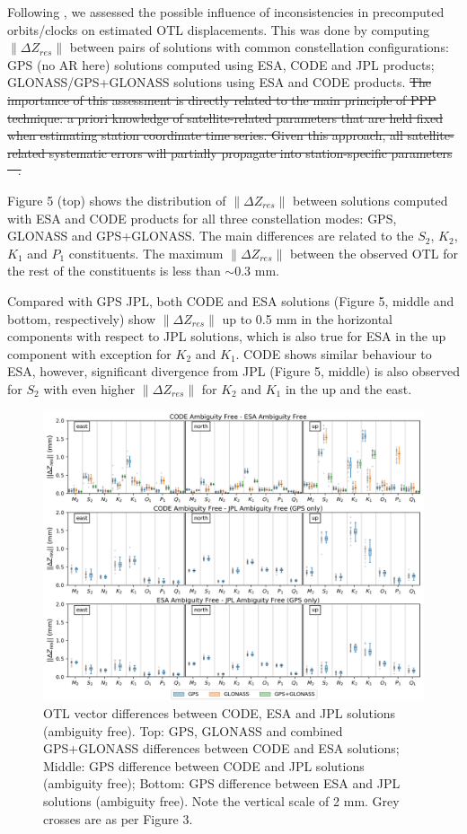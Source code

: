 \documentclass[se, manuscript]{copernicus}
\providecommand{\DIFdel}[1]{{\protect\color{red}\sout{#1}}}                      %
\providecommand{\DIFdelbegin}{} %
\providecommand{\DIFdelend}{} %
\begin{document}
Following \cite{Yuan2013}, we assessed the possible influence of inconsistencies in precomputed orbits/clocks on estimated OTL displacements. This was done by computing $\|\Delta Z_{res}\|$ between pairs of solutions with common constellation configurations: GPS (no AR here) solutions computed using ESA, CODE and JPL products; GLONASS/GPS+GLONASS solutions using ESA and CODE products.
\DIFdelbegin \DIFdel{The importance of this assessment is directly related to the main principle of PPP technique: a priori knowledge of satellite-related parameters that are held fixed when estimating station coordinate time series. Given this approach, all satellite-related systematic errors will partially propagate into station-specific parameters \mbox{%
\citep{Yuan2013}}\hspace{0pt}%
.
}\DIFdelend 

Figure 5 (top) shows the distribution of $\|\Delta Z_{res}\|$ between solutions computed with ESA and CODE products for all three constellation modes: GPS, GLONASS and GPS+GLONASS. The main differences are related to the $S_2$, $K_2$, $K_1$ and $P_1$ constituents. The maximum $\|\Delta Z_{res}\|$ between the observed OTL for the rest of the constituents is less than $\sim$0.3 mm.

Compared with GPS JPL, both CODE and ESA solutions (Figure 5, middle and bottom, respectively) show $\|\Delta Z_{res}\|$ up to 0.5 mm in the horizontal components with respect to JPL solutions, which is also true for ESA in the up component with exception for $K_2$ and $K_1$. CODE shows similar behaviour to ESA, however, significant divergence from JPL (Figure 5, middle) is also observed for $S_2$ with even higher $\|\Delta Z_{res}\|$ for $K_2$ and $K_1$ in the up and the east.

\begin{figure}[t]
\includegraphics[width=17cm]{fig05.png}
\caption{OTL vector differences between CODE, ESA and JPL solutions (ambiguity free). Top: GPS, GLONASS and combined GPS+GLONASS differences between CODE and ESA solutions; Middle: GPS difference between CODE and JPL solutions (ambiguity free); Bottom: GPS difference between ESA and JPL solutions (ambiguity free). Note the vertical scale of 2 mm. Grey crosses are as per Figure 3. }
\end{figure}
\end{document}
